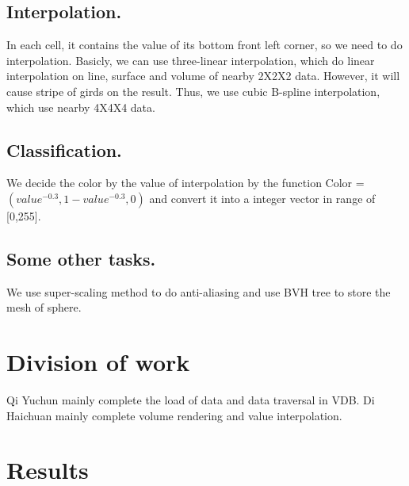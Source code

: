 \documentclass[acmtog]{acmart}
\begin{document}
	\subsection{Interpolation.}
	In each cell, it contains the value of its bottom front left corner, so we need to do interpolation.
	Basicly, we can use three-linear interpolation, which do linear interpolation on line, surface and volume of nearby 2X2X2 data. However, it will cause stripe of girds on the result. Thus, we use
	cubic B-spline interpolation, which use nearby 4X4X4 data.
	\subsection{Classification.}
	We decide the color by the value of interpolation by the function Color = $ (value^{-0.3},1-value^{-0.3},0) $ and convert it into a integer vector in range of [0,255].
	\subsection{Some other tasks.}
	We use super-scaling method to do anti-aliasing and use BVH tree to store the mesh of sphere.
	\section{Division of work}
	Qi Yuchun mainly complete the load of data and data traversal in VDB.
	Di Haichuan mainly complete volume rendering and value interpolation.
	\section{Results}
	\begin{figure}[htb]\centering 
		\\
		\label{Figure1}
	\end{figure}
	\begin{figure}[htb]\centering 
		\\
		\label{Figure1}
	\end{figure}
	
	
	
\end{document}
